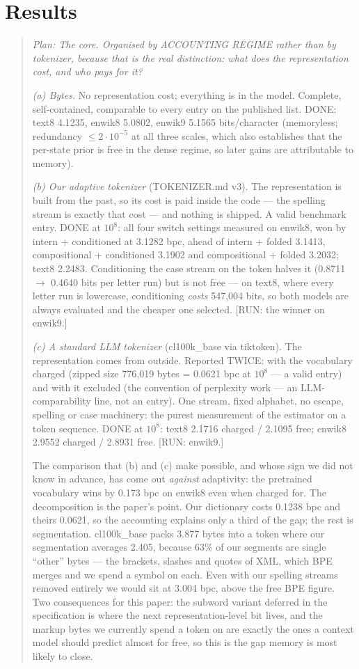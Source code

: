 \documentclass[11pt]{article}
\newcommand{\planned}[1]{\begin{quote}\small\itshape Plan: #1\end{quote}}
\begin{document}
\section{Results}
\planned{The core.  Organised by ACCOUNTING REGIME rather than by
tokenizer, because that is the real distinction: what does the
representation cost, and who pays for it?

\emph{(a) Bytes.}  No representation cost; everything is in the model.
Complete, self-contained, comparable to every entry on the published
list.  DONE: text8 4.1235, enwik8 5.0802, enwik9 5.1565 bits/character
(memoryless; redundancy $\le 2\cdot10^{-5}$ at all three scales, which
also establishes that the per-state prior is free in the dense regime,
so later gains are attributable to memory).

\emph{(b) Our adaptive tokenizer} (TOKENIZER.md v3).  The
representation is built from the past, so its cost is paid inside the
code --- the spelling stream is exactly that cost --- and nothing is
shipped.  A valid benchmark entry.  DONE at $10^8$: all four switch
settings measured on enwik8, won by intern + conditioned at 3.1282
bpc, ahead of intern + folded 3.1413, compositional + conditioned
3.1902 and compositional + folded 3.2032; text8 2.2483.  Conditioning
the case stream on the token halves it (0.8711 $\to$ 0.4640 bits per
letter run) but is not free --- on text8, where every letter run is
lowercase, conditioning \emph{costs} 547{,}004 bits, so both models
are always evaluated and the cheaper one selected.  [RUN: the winner
on enwik9.]

\emph{(c) A standard LLM tokenizer} (cl100k\_base via tiktoken).  The
representation comes from outside.  Reported TWICE: with the
vocabulary charged (zipped size 776{,}019 bytes = 0.0621 bpc at
$10^8$ --- a valid entry) and with it excluded (the convention of
perplexity work --- an LLM-comparability line, not an entry).  One
stream, fixed alphabet, no escape, spelling or case machinery: the
purest measurement of the estimator on a token sequence.  DONE at
$10^8$: text8 2.1716 charged / 2.1095 free; enwik8 2.9552 charged /
2.8931 free.  [RUN: enwik9.]

The comparison that (b) and (c) make possible, and whose sign we did
not know in advance, has come out \emph{against} adaptivity: the
pretrained vocabulary wins by 0.173 bpc on enwik8 even when charged
for.  The decomposition is the paper's point.  Our dictionary costs
0.1238 bpc and theirs 0.0621, so the accounting explains only a third
of the gap; the rest is segmentation.  cl100k\_base packs 3.877 bytes
into a token where our segmentation averages 2.405, because 63\% of
our segments are single ``other'' bytes --- the brackets, slashes and
quotes of XML, which BPE merges and we spend a symbol on each.  Even
with our spelling streams removed entirely we would sit at 3.004 bpc,
above the free BPE figure.  Two consequences for this paper: the
subword variant deferred in the specification is where the next
representation-level bit lives, and the markup bytes we currently
spend a token on are exactly the ones a context model should predict
almost for free, so this is the gap memory is most likely to close.

}
\end{document}
